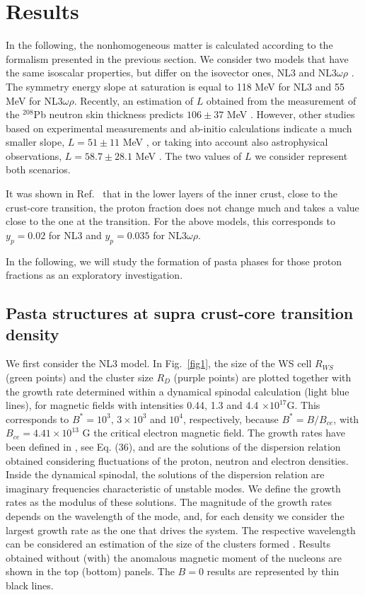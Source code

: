 \documentclass[epj]{svjour}
\begin{document}
\section{Results}
\label{sec:results}



In the following, the nonhomogeneous matter is calculated according to
the formalism presented in the previous section.  We consider two models that
have the same isoscalar properties, but differ on the isovector ones,
NL3 \cite{nl3} and NL3$\omega\rho$ \cite{Pais2016Vlasov}. The symmetry
energy  slope at saturation  is equal to 118 MeV for NL3 and 55 MeV
for NL3$\omega\rho$.
 Recently, an estimation of $L$ obtained from the
 measurement of the $^{208}$Pb neutron skin thickness \cite{PREX2}  predicts
 $106\pm37$ MeV \cite{Reed2021}.
However, other studies based on experimental
measurements and ab-initio calculations indicate a much smaller slope, 
 $L= 51\pm11$ MeV \cite{Lattimer2013}, or taking into account also
 astrophysical observations, $L= 58.7\pm28.1$ MeV
 \cite{Oertel2017}.
 The two values of $L$ we consider represent both scenarios.
 
It was shown in Ref.~\cite{Grill2012} that in the lower layers of the inner
crust, close to the crust-core transition, the proton fraction does not
change much and takes a value close to the one at the transition. For
the above models, this corresponds to $y_p=0.02$ for NL3 and
$y_p=0.035$ for NL3$\omega\rho$.

In the following, we will study the formation of pasta phases for
those proton fractions as an exploratory investigation. 

\subsection{Pasta structures at supra crust-core transition density}


We first consider the NL3 model.  In Fig.~\ref{fig1},  the size of
the WS cell $R_{WS}$ (green
points) and the cluster size $R_D$ (purple points) are plotted together with the growth
rate determined within a dynamical spinodal calculation (light blue
lines), for magnetic fields with intensities  0.44, 1.3 and 4.4
$\times 10^{17}$G. This corresponds to $B^*= 10^3,\, 3\times 10^3$ and
$10^4$, respectively, because $B^*=B/B_{ce}$, with $B_{ce}=4.41\times
10^{13}$ G the critical electron magnetic field.
The growth rates have been defined in \cite{Fang17}, see
  Eq. (36),  and are the
  solutions of the dispersion relation obtained considering
  fluctuations of the proton, neutron and electron  densities. Inside
  the dynamical spinodal, the solutions of the dispersion relation are
  imaginary frequencies characteristic of unstable modes. We define
  the growth rates as the modulus of these solutions. The magnitude of
  the growth rates depends on the wavelength of the mode, and, for each density
we consider the largest growth rate as the one that drives the system. The respective wavelength can be
considered an estimation of the size of the clusters formed \cite{Ducoin2007}.
Results obtained 
without (with)   the anomalous magnetic moment of the nucleons are
shown in the top (bottom) panels. 
The $B=0$ results are represented by thin black lines.
\end{document}
